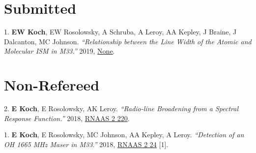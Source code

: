 \documentclass[letterpaper,11pt]{article}
\newenvironment{publist}{
  \begingroup
  \raggedright
  \begin{description}[leftmargin=4ex,style=sameline]
}{
  \end{description}
  \endgroup
}
\begin{document}
\section*{Submitted}

\begin{publist}
\item[1.] \textbf{EW Koch}, EW Rosolowsky, A Schruba, A Leroy, AA Kepley, J Braine, J Dalcanton, MC Johnson. \textit{``Relationship between the Line Width of the Atomic and Molecular ISM in M33.''} 2019, \href{http://adsabs.harvard.edu/abs/None}{None}.
\end{publist}

\section*{Non-Refereed}

\begin{publist}
\item[2.] \textbf{E Koch}, E Rosolowsky, AK Leroy. \textit{``Radio-line Broadening from a Spectral Response Function.''} 2018, \href{http://adsabs.harvard.edu/abs/2018RNAAS...2d.220K}{RNAAS 2 220}.
\item[1.] \textbf{E Koch}, E Rosolowsky, MC Johnson, AA Kepley, A Leroy. \textit{``Detection of an OH 1665 MHz Maser in M33.''} 2018, \href{http://adsabs.harvard.edu/abs/2018RNAAS...2a..24K}{RNAAS 2 24} [1].
\end{publist}
\end{document}
